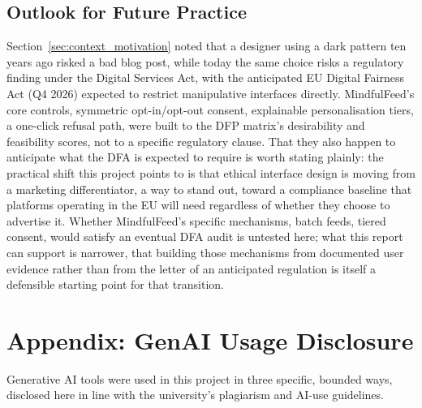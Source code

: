 \documentclass[11pt]{article}
\begin{document}
\subsection{Outlook for Future Practice}
Section~\ref{sec:context_motivation} noted that a designer using a dark pattern ten years ago risked a bad blog post, while today the same choice risks a regulatory finding under the Digital Services Act, with the anticipated EU Digital Fairness Act (Q4 2026) expected to restrict manipulative interfaces directly. MindfulFeed's core controls, symmetric opt-in/opt-out consent, explainable personalisation tiers, a one-click refusal path, were built to the DFP matrix's desirability and feasibility scores, not to a specific regulatory clause. That they also happen to anticipate what the DFA is expected to require is worth stating plainly: the practical shift this project points to is that ethical interface design is moving from a marketing differentiator, a way to stand out, toward a compliance baseline that platforms operating in the EU will need regardless of whether they choose to advertise it. Whether MindfulFeed's specific mechanisms, batch feeds, tiered consent, would satisfy an eventual DFA audit is untested here; what this report can support is narrower, that building those mechanisms from documented user evidence rather than from the letter of an anticipated regulation is itself a defensible starting point for that transition.

\clearpage
\printbibliography

\clearpage
\appendix
\section{Appendix: GenAI Usage Disclosure}
\label{sec:ai_disclosure_mindfulfeed}
Generative AI tools were used in this project in three specific, bounded ways, disclosed here in line with the university's plagiarism and AI-use guidelines.
\end{document}
